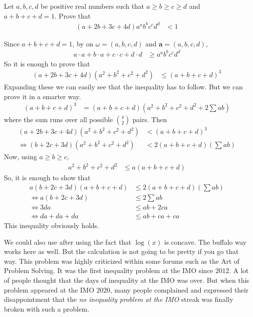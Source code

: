 \documentclass{subfile}
\begin{document}
		\begin{problem}
			Let $a,b,c,d$ be positive real numbers such that $a\geq b\geq c\geq d$ and $a+b+c+d=1$. Prove that
				\begin{align*}
					(a+2b+3c+4d)a^{a}b^{b}c^{c}d^{d}
						& < 1
				\end{align*}
			
				\begin{solution}
					Since $a+b+c+d=1$, by  on $\omega=(a,b,c,d)$ and $\mathbf{a}=(a,b,c,d)$,
						\begin{align*}
							a\cdot a+b\cdot a+c\cdot c+d\cdot d
								& \geq a^{a}b^{b}c^{c}d^{d}
						\end{align*}
					So it is enough to prove that
						\begin{align*}
							(a+2b+3c+4d)(a^{2}+b^{2}+c^{2}+d^{2})
								& \leq (a+b+c+d)^{3}
						\end{align*}
					Expanding these we can easily see that the inequality has to follow. But we can prove it in a smarter way.
						\begin{align*}
							(a+b+c+d)^{3}
								& = (a+b+c+d)\left(a^{2}+b^{2}+c^{2}+d^{2}+2\sum ab\right)
						\end{align*}
					where the sum runs over all possible $\binom{4}{2}$ pairs. Then
						\begin{align*}
							(a+2b+3c+4d)(a^{2}+b^{2}+c^{2}+d^{2})
							& < (a+b+c+d)^{3}\\
							\iff (b+2c+3d)(a^{2}+b^{2}+c^{2}+d^{2})
								& < 2(a+b+c+d)\left(\sum ab\right)
						\end{align*}
					Now, using $a\geq b\geq c$,
						\begin{align*}
							a^{2}+b^{2}+c^{2}+d^{2}
								& \leq a(a+b+c+d)
						\end{align*}
					So, it is enough to show that
						\begin{align*}
							a(b+2c+3d)(a+b+c+d)
								& \leq  2(a+b+c+d)\left(\sum ab\right)\\
							\iff a(b+2c+3d)
								& \leq 2\sum ab\\
							\iff 3da
								& \leq ab+2ca\\
							\iff da+da+da
								& \leq ab+ca+ca
						\end{align*}
					This inequality obviously holds.
				\end{solution}
			
				\begin{remark}
					We could also use  after using the fact that $\log(x)$ is concave. The buffalo way works here as well. But the calculation is not going to be pretty if you go that way. This problem was highly criticized within some forums such as the Art of Problem Solving. It was the first inequality problem at the IMO since $2012$. A lot of people thought that the days of inequality at the IMO was over. But when this problem appeared at the IMO $2020$, many people complained and expressed their disappointment that the \textit{no inequality problem at the IMO} streak was finally broken with such a problem.
				\end{remark}
		\end{problem}
	
\end{document}
